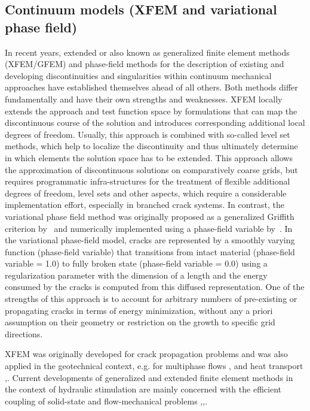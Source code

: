\subsection{Continuum models (XFEM and variational phase field)}

In recent years, extended \cite{Belytschko1999601} or also known as generalized \cite{Strouboulis200043}  finite element methods (XFEM/GFEM) and phase-field methods \cite{Bourdin2000797} for the description of existing and developing discontinuities and singularities within continuum mechanical approaches have established themselves ahead of all others. 
Both methods differ fundamentally and have their own strengths and weaknesses. 
XFEM locally extends the approach and test function space by formulations that can map the discontinuous course of the solution and introduces corresponding additional local degrees of freedom. 
Usually, this approach is combined with so-called level set methods, which help to localize the discontinuity and thus ultimately determine in which elements the solution space has to be extended. 
This approach allows the approximation of discontinuous solutions on comparatively coarse grids, but requires programmatic infra-structures for the treatment of flexible additional degrees of freedom, level sets and other aspects, which require a considerable implementation effort, especially in branched crack systems. 
In contrast, the variational phase field method was originally proposed as a generalized Griffith criterion by~\cite{Francfort1998} and numerically implemented using a phase-field variable by~\cite{Bourdin2000}.
In the variational phase-field model, cracks are represented by a smoothly varying function (phase-field variable) that transitions from intact material (phase-field variable = 1.0) to fully broken state (phase-field variable = 0.0) using a regularization parameter with the dimension of a length and the energy consumed by the cracks is computed from this diffused representation. 
One of the strengths of this approach is to account for arbitrary numbers of pre-existing or propagating cracks in terms of energy minimization, without any a priori assumption on their geometry or restriction on the growth to specific grid directions.

XFEM \cite{Belytschko1999601} was originally developed for crack propagation problems and was also applied in the geotechnical context, e.g. for multiphase flows \cite{Chessa200310},\cite{Mohammadnejad2013327} and heat transport \cite{Khoei2012701},\cite{Shao2014155}. Current developments of generalized and extended finite element methods in the context of hydraulic stimulation are mainly concerned with the efficient coupling of solid-state and flow-mechanical problems \cite{Yazid20094269},\cite{Watanabe20121010},\cite{Meschke2015438}.

